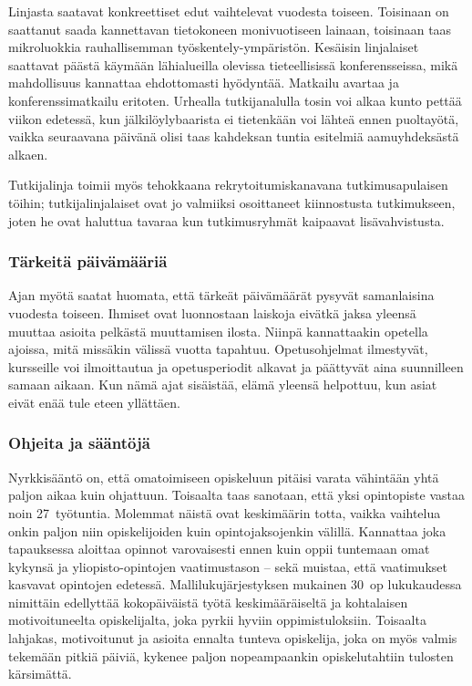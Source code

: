 \documentclass[../ala_hataile.tex]{subfiles}
\begin{document}
	Linjasta saatavat konkreettiset edut
	vaihtelevat vuodesta toiseen. Toisinaan
	on saattanut saada kannettavan
	tietokoneen monivuotiseen lainaan, toisinaan
	taas mikroluokkia rauhallisemman
	työskentely-ympäristön. Kesäisin linjalaiset
	saattavat päästä käymään lähialueilla
	olevissa tieteellisissä konferensseissa,
	mikä mahdollisuus kannattaa ehdottomasti
	hyödyntää. Matkailu avartaa ja konferenssimatkailu
	eritoten. Urhealla tutkijanalulla
	tosin voi alkaa kunto pettää viikon edetessä,
	kun jälkilöylybaarista ei tietenkään voi
	lähteä ennen puoltayötä, vaikka seuraavana päivänä olisi taas kahdeksan tuntia esitelmiä
	aamuyhdeksästä alkaen.
	
	Tutkijalinja toimii myös tehokkaana
	rekrytoitumiskanavana tutkimusapulaisen
	töihin; tutkijalinjalaiset ovat
	jo valmiiksi osoittaneet kiinnostusta tutkimukseen,
	joten he ovat haluttua tavaraa
	kun tutkimusryhmät kaipaavat lisävahvistusta.
	
	\subsubsection*{Tärkeitä päivämääriä}
	Ajan myötä saatat huomata, että tärkeät
	päivämäärät pysyvät samanlaisina vuodesta
	toiseen. Ihmiset ovat luonnostaan laiskoja
	eivätkä jaksa yleensä muuttaa asioita
	pelkästä muuttamisen ilosta.
	Niinpä kannattaakin opetella ajoissa,
	mitä missäkin välissä vuotta
	tapahtuu. Opetusohjelmat ilmestyvät, kursseille
	voi ilmoittautua ja opetusperiodit alkavat
	ja päättyvät aina suunnilleen samaan
	aikaan. Kun nämä ajat sisäistää, elämä
	yleensä helpottuu, kun asiat eivät
	enää tule eteen yllättäen.
	
	\subsubsection*{Ohjeita ja sääntöjä}
	Nyrkkisääntö on, että omatoimiseen
	opiskeluun pitäisi varata vähintään yhtä
	paljon aikaa kuin ohjattuun. Toisaalta taas
	sanotaan, että yksi opintopiste vastaa noin
	27~työtuntia. Molemmat näistä ovat keskimäärin
	totta, vaikka vaihtelua onkin paljon
	niin opiskelijoiden kuin opintojaksojenkin
	välillä. Kannattaa joka tapauksessa aloittaa
	opinnot varovaisesti ennen kuin oppii
	tuntemaan omat kykynsä ja yliopisto-opintojen
	vaatimustason -- sekä muistaa, että
	vaatimukset kasvavat opintojen edetessä.
	Mallilukujärjestyksen mukainen 30~op lukukaudessa
	nimittäin edellyttää kokopäiväistä
	työtä keskimääräiseltä ja kohtalaisen
	motivoituneelta opiskelijalta, joka pyrkii
	hyviin oppimistuloksiin. Toisaalta lahjakas, 
	motivoitunut ja asioita ennalta tunteva
	opiskelija, joka on myös valmis tekemään
	pitkiä päiviä, kykenee paljon nopeampaankin
	opiskelutahtiin tulosten kärsimättä.
	
\end{document}

